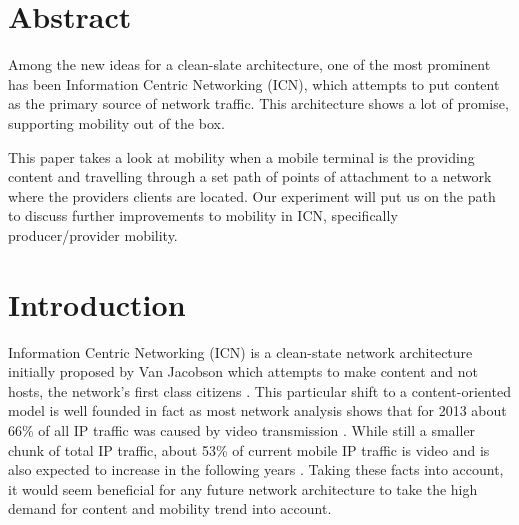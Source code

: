 \documentclass[8pt,twocolumn]{article}
\begin{document}

\section{Abstract}

Among the new ideas for a clean-slate architecture, one of the most
prominent has been Information Centric Networking (ICN), which attempts to put
content as the primary source of network traffic. This architecture 
shows a lot of promise, 
supporting mobility out of the box. 

This paper takes a look at mobility when a mobile terminal is 
the providing content and travelling through a set path of points of
attachment to a network where the providers clients are located. Our experiment
will put us on the path to discuss further improvements to mobility in ICN, 
specifically producer/provider mobility. 

\section{Introduction}
Information Centric Networking (ICN) is a clean-state network architecture
initially proposed by Van Jacobson which attempts to make content and not
hosts, the network's first class citizens
 \cite{Jacobson:2009:NNC:1658939.1658941}. This particular shift to a
content-oriented model is well founded in fact as most network analysis shows
that for 2013 about 66\% of all IP traffic was caused by video transmission
\cite{cisco:2014:Online}.
While still a smaller chunk of total IP traffic, about 53\% of current mobile
IP traffic is video and is also expected to increase in the following years
\cite{ciscomobile:2014:Online}. Taking these facts into account, it would seem
beneficial for any future network architecture to take the high demand for
content and mobility trend into account.
\end{document}
